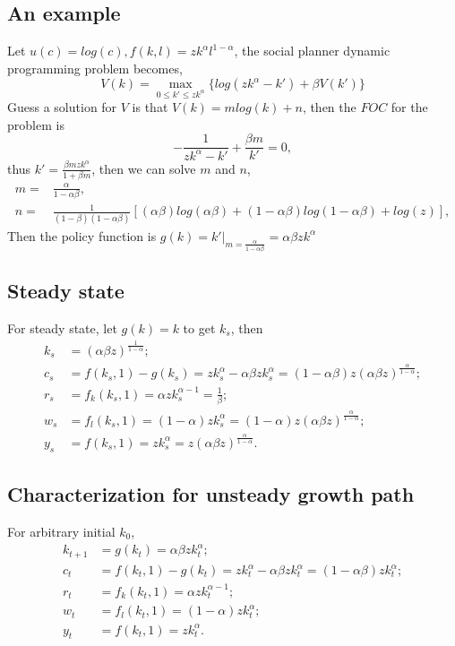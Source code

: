\documentclass[12pt,notitlepage]{article}%
\numberwithin{equation}{section}
\begin{document}
		\subsection{An example}
			Let $u(c)=log(c), f(k,l)=zk^{\alpha}l^{1-\alpha}$, the social planner dynamic programming problem becomes,
			\begin{equation*}
				V(k)=\max_{0\leq k'\leq zk^{\alpha}} \{log(zk^{\alpha}-k')+\beta V(k')\}
			\end{equation*}
			Guess a solution for $V$ is that $V(k)=mlog(k)+n$, then the $FOC$ for the problem is $$-\frac{1}{zk^{\alpha}-k'}+\frac{\beta m}{k'}=0,$$ thus $k'=\frac{\beta mzk^{\alpha}}{1+\beta m}$, then we can solve $m$ and $n$,
			\begin{equation*}
			\begin{split}
				m=&\frac{\alpha}{1-\alpha \beta},\\
				n=&\frac{1}{(1-\beta)(1-\alpha \beta)}[(\alpha \beta)log(\alpha \beta)+(1-\alpha \beta)log(1-\alpha \beta)+log(z)],
			\end{split}
			\end{equation*}
			Then the policy function is $g(k)=k'|_{m=\frac{\alpha}{1-\alpha \beta}}=\alpha \beta zk^{\alpha}$
		
		\subsection{Steady state}
			For steady state, let $g(k)=k$ to get $k_s$, then
			\begin{equation*}
			\begin{split}
				k_s&=(\alpha \beta z)^{\frac{1}{1-\alpha}};\\
				c_s&=f(k_s,1)-g(k_s)=zk_s^{\alpha}-\alpha \beta zk_s^{\alpha}=(1-\alpha \beta)z(\alpha \beta z)^{\frac{\alpha}{1-\alpha}};\\
				r_s&=f_k(k_s,1)=\alpha zk_s^{\alpha -1}=\frac{1}{\beta};\\
				w_s&=f_l(k_s,1)=(1-\alpha) zk_s^{\alpha}=(1-\alpha) z(\alpha \beta z)^{\frac{\alpha}{1-\alpha}};\\
				y_s&=f(k_s,1)=zk_s^{\alpha}=z(\alpha \beta z)^{\frac{\alpha}{1-\alpha}}.
			\end{split}
			\end{equation*} 
		
		\subsection{Characterization for unsteady growth path}
			For arbitrary initial $k_0$,
			\begin{equation*}
			\begin{split}
				k_{t+1}&=g(k_t)=\alpha \beta z k_t^{\alpha};\\
				c_t&=f(k_t,1)-g(k_t)=zk_t^{\alpha}-\alpha \beta zk_t^{\alpha}=(1-\alpha \beta)zk_t^{\alpha};\\
				r_t&=f_k(k_t,1)=\alpha zk_t^{\alpha -1};\\
				w_t&=f_l(k_t,1)=(1-\alpha) zk_t^{\alpha};\\
				y_t&=f(k_t,1)=zk_t^{\alpha}.
			\end{split}
			\end{equation*} 
	\setcounter{table}{0}
	
	\bigskip
\end{document}
